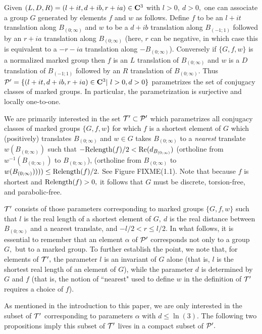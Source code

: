 Given $(L,D,R)=(l+it, d+ib, r+ia)\in{\bf C}^3$ with $l > 0,\ d > 0,$ one  can associate a group $G$ generated by  elements $f$ and $w$ as follows.  Define $f$ to be an $l+it$ translation along $B_{(0;\infty)}$ and $w$ to be a $d+ib$ translation along $ B_{(-1;1)}$ followed by an $r+ia$ translation along $B_{(0;\infty)}$ (here, $r$ can be negative, in which case this is equivalent to
a
$-r-ia$ translation along $-B_{(0;\infty)}$).  Conversely if $\{G,f,w\}$ is a normalized marked group then $f$ is an $L$ translation of $B_{(0;\infty)}$
and $w$ is a $D$ translation of 
$ B_{(-1;1)}$ followed by an $R$ translation of $B_{(0;\infty)}.$ Thus
${\cal P}^\prime = \{(l+it,d+ib,r+ia)\in {\bf C}^3 | \ l>0, d>0\}$ 
parametrizes the
set of conjugacy classes of marked groups.  In particular, the parametrization is surjective and locally one-to-one.

We are primarily interested in the set 
${\cal T}^{\prime}\subset {\cal P}^{\prime}$
which parametrizes all conjugacy classes of 
marked groups
$\{G,f,w\}$ for which $f$ is a shortest element  of $G$ which (positively) translates $B_{(0;\infty)}$ and $w\in G$ takes $ B_{(0;\infty)}$ to a
{\it nearest} translate $w(B_{(0;\infty)})$ such that 
$-{\rm Relength}(f)/2< {\rm Re}(d_ {B_{(0;\infty)}})$
(ortholine from $w^{-1}( B_{(0;\infty)})$ to $ B_{(0;\infty)}$),
(ortholine from $ B_{(0;\infty)}$ to $w(B_{(0;\infty)}))))
\le {\rm Relength}(f)/2.$  
See Figure FIXME(1.1).
Note that because $f$ is shortest and
${\rm Relength}(f) > 0,$ it follows that $G$ must be 
discrete, torsion-free, and parabolic-free.
 


  ${\cal T}^{\prime}$ consists of those parameters corresponding to marked groups $\{G,f,w\}$ such that $l$ is the real
length of a shortest element of $G,\  d$ is the real distance between $ B_{(0;\infty)}$ and a nearest
translate, and $-l/2<r\le l/2.$  
In what follows, it is
essential to remember that an element $\alpha$ of ${\cal P^{\prime}}$ corresponds not only
to a group $G,$ but to a marked group.  
To further establish the point, we note that,
for elements of ${\cal T}^{\prime},$
the parameter $l$ is an invariant of $G$ alone (that is, $l$ is the shortest real length of an element of $G$), while  the parameter $d$ is determined by $G$ and $f$ (that is, the notion of ``nearest" used to define $w$ in the definition of ${\cal T}^{\prime}$ requires a choice of $f$).

As mentioned in the introduction to this paper, we are only interested in the subset of ${\cal T}^{\prime}$ corresponding to
parameters $\alpha$ with $d \le \ln(3).$  The
following two propositions imply this subset of ${\cal T}^{\prime}$ lives in a compact subset of ${\cal P}^{\prime}.$
\enddemo

